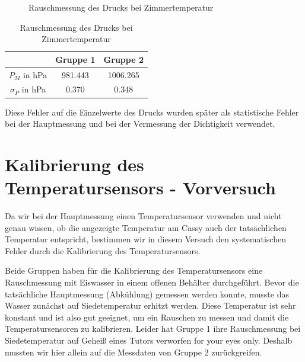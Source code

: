 \documentclass[12pt,a4paper]{article}
\begin{document}
\begin{figure}[H]
\caption{Rauschmessung des Drucks bei Zimmertemperatur}
\end{figure}

\begin{table}[H]\centering
\caption{Rauschmessung des Drucks bei Zimmertemperatur}
\begin{tabular}{c|c|c}
 & Gruppe 1 & Gruppe 2 \\ 
\hline 
$P_M$ in hPa & 981.443 & 1006.265 \\ 
$\sigma_P$ in hPa & 0.370 & 0.348 \\  
\end{tabular} 
\end{table}

Diese Fehler auf die Einzelwerte des Drucks wurden später als statistische Fehler bei der Hauptmessung und bei der Vermessung der Dichtigkeit verwendet.
\newpage
\section{Kalibrierung des Temperatursensors - Vorversuch}
Da wir bei der Hauptmessung einen Temperatursensor verwenden und nicht genau wissen, ob die angezeigte Temperatur am Cassy auch der tatsächlichen Temperatur entspricht, bestimmen wir in diesem Versuch den systematischen Fehler durch die Kalibrierung des Temperatursensors.

Beide Gruppen haben für die Kalibrierung des Temperatursensors  eine Rauschmessung mit Eiswasser in einem offenen Behälter durchgeführt. \newline
Bevor die tatsächliche Hauptmessung (Abkühlung) gemessen werden konnte, musste das Wasser zunächst auf Siedetemperatur erhitzt werden. Diese Temperatur ist sehr konstant und ist also gut geeignet, um ein Rauschen zu messen und damit die Temperatursensoren zu kalibrieren. \newline
Leider hat Gruppe 1 ihre Rauschmessung bei Siedetemperatur auf Geheiß eines Tutors verworfen \glqq for your eyes only\grqq.
Deshalb mussten wir hier allein auf die Messdaten von Gruppe 2 zurückgreifen.
\end{document}
